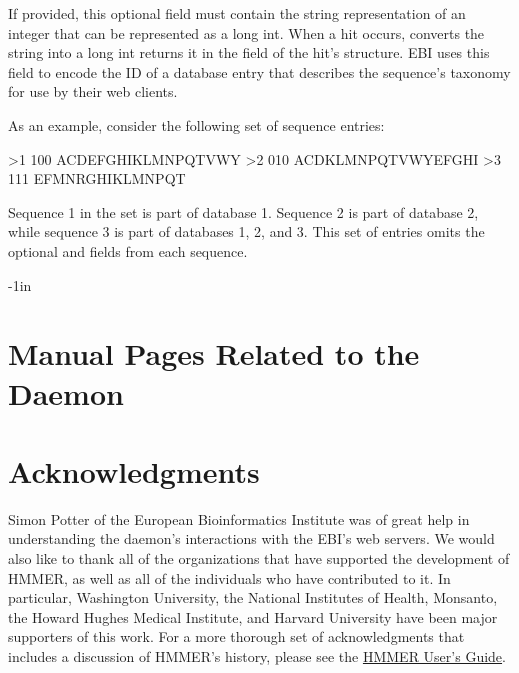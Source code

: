 \documentclass[notoc,justified]{tufte-book}    %
\begin{document}
\begin{sreitems}{}
\item [\monob{taxonomy\_id}] If provided, this optional field must contain the string representation of an integer that can be represented as a long int.  When a hit occurs,  converts the string into a long int returns it in the  field of the hit's  structure.  EBI uses this field to encode the ID of a database entry that describes the sequence's taxonomy for use by their web clients.

\end{sreitems}

As an example, consider the following set of sequence entries:

\begin{sreoutput}
>1 100
ACDEFGHIKLMNPQTVWY
>2 010
ACDKLMNPQTVWYEFGHI
>3 111
EFMNRGHIKLMNPQT
\end{sreoutput}

Sequence 1 in the set is part of database 1.  Sequence 2 is part of database 2, while sequence 3 is part of databases 1, 2, and 3.  This set of entries omits the optional  and  fields from each sequence.




\begin{adjustwidth}{}{-1in}   
\chapter{Manual Pages Related to the Daemon}

\end{adjustwidth}

\chapter{Acknowledgments}
Simon Potter of the European Bioinformatics Institute was of great help in understanding the daemon's interactions with the EBI's web servers.  We would also like to thank all of the organizations that have supported the development of HMMER, as well as all of the individuals who have contributed to it. In particular, Washington University, the National Institutes of Health, Monsanto, the Howard Hughes Medical Institute, and Harvard University have been major supporters of this work.  For a more thorough set of acknowledgments that includes a discussion of HMMER's history, please see the \underline{HMMER User's Guide}.

\label{manualend}

% 
\end{document}
